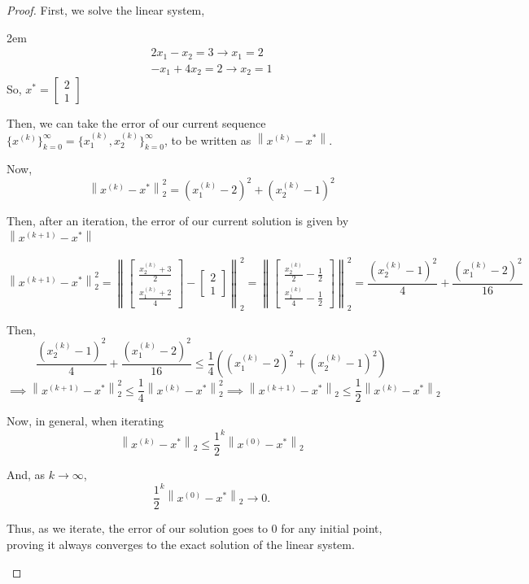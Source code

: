 \documentclass[12pt]{article}
\begin{document}
\begin{proof}First, we solve the linear system,
\begin{adjustwidth}{2em}{}
\begin{equation}\label{eq:lin-sys}
\begin{aligned}
2x_1 - x_2 = 3 \rightarrow x_1 = 2\\
-x_1 + 4x_2 = 2 \rightarrow x_2 = 1
\end{aligned}
\end{equation} 
So, $x^* = 
\begin{bmatrix}
2 \\ 1
\end{bmatrix}
$

\noindent Then, we can take the error of our current sequence $\{x^{(k)}\}_{k = 0}^{\infty} = \{ x_1^{(k)}, x_2^{(k)}\}_{k = 0}^{\infty}$, to be written as $\left\|x^{(k)} - x^*\right\|$. 

\noindent Now, \[ \left\|x^{(k)} - x^*\right\|^{2}_{2} = (x_1^{(k)} - 2)^2 + (x_2^{(k)} - 1)^2\]

\noindent Then, after an iteration, the error of our current solution is given by $\left\|x^{(k + 1)} - x^*\right\|$

\[ \left\|x^{(k + 1)} - x^*\right\|^2_2 = \left\| 
\begin{bmatrix}
\frac{x_2^{(k)} + 3}{2} \\
\frac{x_1^{(k)} + 2}{4} 
\end{bmatrix} - \begin{bmatrix}
2 \\ 
1
\end{bmatrix}
\right\|^2_2 = \left\|
\begin{bmatrix}
\frac{x_2^{(k)}}{2} - \frac{1}{2}\\
\frac{x_1^{(k)}}{4}  - \frac{1}{2}
\end{bmatrix}\right\|^2_2 = \frac{(x_2^{(k)} - 1)^2}{4} + \frac{(x_1^{(k)} - 2)^2}{16}
\]

\noindent Then,
\[ \frac{(x_2^{(k)} - 1)^2}{4} + \frac{(x_1^{(k)} - 2)^2}{16}
\leq \frac{1}{4}\left((x_1^{(k)} - 2)^2 + (x_2^{(k)} - 1)^2\right)\]
\[\implies \left\|x^{(k + 1)} - x^*\right\|^2_2 \leq \frac{1}{4}\left\|x^{(k)} - x^*\right\|^2_2 \implies \left\|x^{(k + 1)} - x^*\right\|_2 \leq \frac{1}{2}\left\|x^{(k)} - x^*\right\|_2\]

\noindent Now, in general, when iterating
\[\left\|x^{(k)} - x^*\right\|_2 \leq \frac{1}{2}^k\left\|x^{(0)} - x^*\right\|_2 \]

\noindent And, as $k \rightarrow \infty$,
\[ \frac{1}{2}^k\left\|x^{(0)} - x^*\right\|_2 \rightarrow 0.\]

\noindent Thus, as we iterate, the error of our solution goes to 0 for any initial point, proving it always converges to the exact solution of the linear system.
\end{adjustwidth}

\end{proof}
\end{document}
